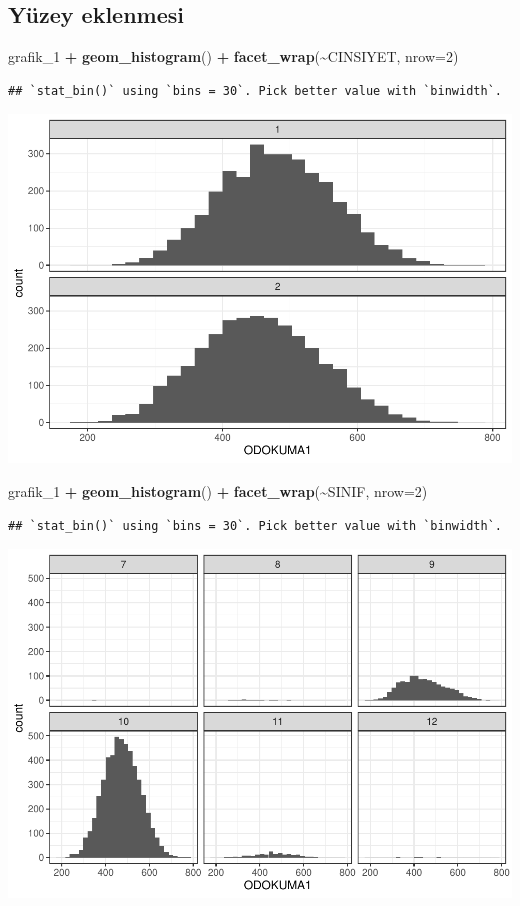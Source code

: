 \documentclass[
  oneside]{book}
\newenvironment{Shaded}{\begin{snugshade}}{\end{snugshade}}
\newcommand{\AttributeTok}[1]{\textcolor[rgb]{0.13,0.29,0.53}{#1}}
\newcommand{\DecValTok}[1]{\textcolor[rgb]{0.00,0.00,0.81}{#1}}
\newcommand{\FunctionTok}[1]{\textcolor[rgb]{0.13,0.29,0.53}{\textbf{#1}}}
\newcommand{\NormalTok}[1]{#1}
\newcommand{\SpecialCharTok}[1]{\textcolor[rgb]{0.81,0.36,0.00}{\textbf{#1}}}
\begin{document}
\hypertarget{yuxfczey-eklenmesi}{%
\subsection{Yüzey eklenmesi}\label{yuxfczey-eklenmesi}}

\begin{Shaded}
\begin{Highlighting}[]
\NormalTok{grafik\_1 }\SpecialCharTok{+}
  \FunctionTok{geom\_histogram}\NormalTok{()  }\SpecialCharTok{+}
  \FunctionTok{facet\_wrap}\NormalTok{(}\SpecialCharTok{\textasciitilde{}}\NormalTok{CINSIYET, }\AttributeTok{nrow=}\DecValTok{2}\NormalTok{)}
\end{Highlighting}
\end{Shaded}

\begin{verbatim}
## `stat_bin()` using `bins = 30`. Pick better value with `binwidth`.
\end{verbatim}

\begin{center}\includegraphics[width=0.5\linewidth]{15-betimleyici-istatistik_files/figure-latex/unnamed-chunk-28-1} \end{center}

\begin{Shaded}
\begin{Highlighting}[]
\NormalTok{grafik\_1 }\SpecialCharTok{+} 
  \FunctionTok{geom\_histogram}\NormalTok{() }\SpecialCharTok{+}
   \FunctionTok{facet\_wrap}\NormalTok{(}\SpecialCharTok{\textasciitilde{}}\NormalTok{SINIF, }\AttributeTok{nrow=}\DecValTok{2}\NormalTok{)}
\end{Highlighting}
\end{Shaded}

\begin{verbatim}
## `stat_bin()` using `bins = 30`. Pick better value with `binwidth`.
\end{verbatim}

\begin{center}\includegraphics[width=0.5\linewidth]{15-betimleyici-istatistik_files/figure-latex/unnamed-chunk-29-1} \end{center}
\end{document}
